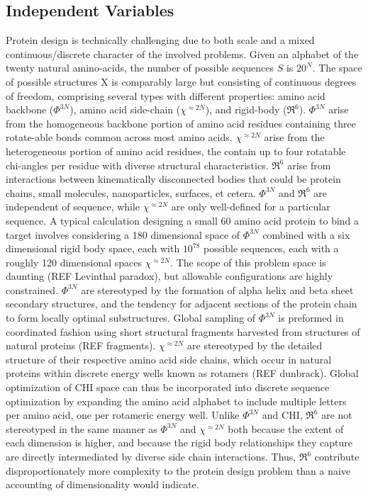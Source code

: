 \documentclass{article}
\begin{document}
\subsection{Independent Variables}

Protein design is technically challenging due to both scale and a mixed
continuous/discrete character of the involved problems. Given an alphabet of the
twenty natural amino-acids, the number of possible sequences $S$ is $20^N$. The
space of possible structures X is comparably large but consisting of continuous
degrees of freedom, comprising several types with different properties:
amino acid backbone ($\Phi^{3N}$), amino acid side-chain ($\chi^{\approx2N}$),
and rigid-body ($\Re^6$).
$\Phi^{3N}$ arise from the homogeneous backbone portion of amino acid residues
containing three rotate-able bonds common across most amino acids. $\chi^{\approx2N}$
arise from the heterogeneous portion of amino acid residues, the contain up to
four rotatable chi-angles per residue with diverse structural characteristics.
$\Re^6$ arise from interactions between kinematically disconnected bodies that
could be protein chains, small molecules, nanoparticles, surfaces, et cetera. $\Phi^{3N}$
and $\Re^6$ are independent of sequence, while $\chi^{\approx2N}$ are only well-defined
for a particular sequence.
A typical calculation designing a small 60 amino acid
protein to bind a target involves considering a 180 dimensional space of $\Phi^{3N}$
combined with a six dimensional rigid body space, each with $10^78$ possible
sequences, each with a roughly 120 dimensional spaces $\chi^{\approx2N}$.
The scope of
this problem space is daunting (REF Levinthal paradox), but allowable
configurations are highly constrained. $\Phi^{3N}$ are stereotyped by the formation
of alpha helix and beta sheet secondary structures, and the tendency for
adjacent sections of the protein chain to form locally optimal substructures.
Global sampling of $\Phi^{3N}$ is preformed in coordinated fashion using short
structural fragments harvested from structures of natural proteins (REF
fragments). $\chi^{\approx2N}$ are stereotyped by the detailed structure of their
respective amino acid side chains, which occur in natural proteins within
discrete energy wells known as rotamers (REF dunbrack). Global optimization of
CHI space can thus be incorporated into discrete sequence optimization by
expanding the amino acid alphabet to include multiple letters per amino acid,
one per rotameric energy well. Unlike $\Phi^{3N}$ and CHI, $\Re^6$ are not stereotyped in
the same manner as $\Phi^{3N}$ and $\chi^{\approx2N}$ both because the extent of each dimension is
higher, and because the rigid body relationships they capture are directly
intermediated by diverse side chain interactions. Thus, $\Re^6$ contribute
disproportionately more complexity to the protein design problem than a naive
accounting of dimensionality would indicate.
\end{document}
